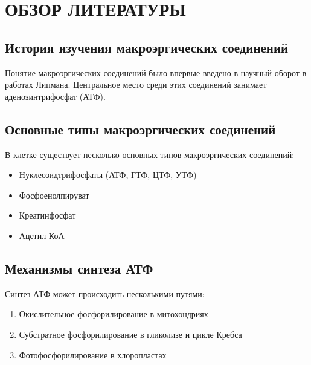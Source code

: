 \section{ОБЗОР ЛИТЕРАТУРЫ}

\subsection{История изучения макроэргических соединений}
Понятие макроэргических соединений было впервые введено в научный оборот в работах Липмана\cite{example1}. Центральное место среди этих соединений занимает аденозинтрифосфат (АТФ).

\subsection{Основные типы макроэргических соединений}
В клетке существует несколько основных типов макроэргических соединений:
\begin{itemize}
    \item Нуклеозидтрифосфаты (АТФ, ГТФ, ЦТФ, УТФ)
    \item Фосфоенолпируват
    \item Креатинфосфат
    \item Ацетил-КоА
\end{itemize}

\subsection{Механизмы синтеза АТФ}
Синтез АТФ может происходить несколькими путями:
\begin{enumerate}
    \item Окислительное фосфорилирование в митохондриях
    \item Субстратное фосфорилирование в гликолизе и цикле Кребса
    \item Фотофосфорилирование в хлоропластах
\end{enumerate}

